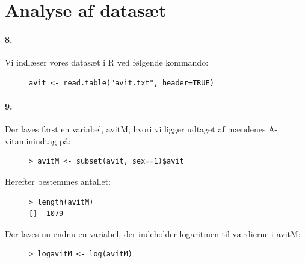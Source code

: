 \section{Analyse af datasæt}

\paragraph{8.}
Vi indlæser vores datasæt i R ved følgende kommando:

\begin{figure}[H]
\label{fig:anal0}
\begin{center}
\begin{verbatim}
avit <- read.table("avit.txt", header=TRUE)
\end{verbatim}
\caption{}
\end{center}
\end{figure}

\paragraph{9.}
Der laves først en variabel, avitM, hvori vi ligger udtaget af 
mændenes A-vitaminindtag på:

\begin{figure}[H]
\label{fig:anal1}
\begin{center}
\begin{verbatim}
> avitM <- subset(avit, sex==1)$avit
\end{verbatim}
\caption{}
\end{center}
\end{figure}

Herefter bestemmes antallet:

\begin{figure}[H]
\label{fig:anal2}
\begin{center}
\begin{verbatim}
> length(avitM)
[]  1079
\end{verbatim}
\caption{}
\end{center}
\end{figure}

Der laves nu endnu en variabel, der indeholder logaritmen til 
værdierne i avitM:

\begin{figure}[H]
\label{fig:anal3}
\begin{center}
\begin{verbatim}
> logavitM <- log(avitM)
\end{verbatim}
\caption{}
\end{center}
\end{figure}

